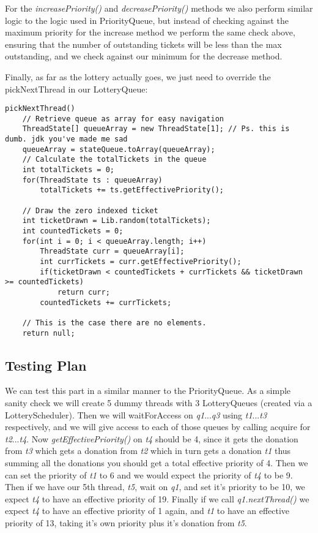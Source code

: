 \documentclass{article}
\begin{document}
For the \textit{increasePriority()} and \textit{decreasePriority()} methods we also perform similar logic to the
logic used in PriorityQueue, but instead of checking against the maximum priority for the increase method we perform
the same check above, ensuring that the number of outstanding tickets will be less than the max outstanding, and
we check against our minimum for the decrease method.

Finally, as far as the lottery actually goes, we just need to override the pickNextThread in our LotteryQueue: 
\begin{verbatim}
pickNextThread()
    // Retrieve queue as array for easy navigation
    ThreadState[] queueArray = new ThreadState[1]; // Ps. this is dumb. jdk you've made me sad
    queueArray = stateQueue.toArray(queueArray);
    // Calculate the totalTickets in the queue
    int totalTickets = 0;
    for(ThreadState ts : queueArray)
        totalTickets += ts.getEffectivePriority();
    
    // Draw the zero indexed ticket
    int ticketDrawn = Lib.random(totalTickets);
    int countedTickets = 0;
    for(int i = 0; i < queueArray.length; i++)
        ThreadState curr = queueArray[i];
        int currTickets = curr.getEffectivePriority();
        if(ticketDrawn < countedTickets + currTickets && ticketDrawn >= countedTickets)
            return curr;
        countedTickets += currTickets;
    
    // This is the case there are no elements.
    return null;
\end{verbatim}

\subsection*{Testing Plan}

We can test this part in a similar manner to the PriorityQueue. As a simple sanity check we will create 5 dummy
threads with 3 LotteryQueues (created via a LotteryScheduler). Then we will waitForAccess on \textit{q1}...\textit{q3}
using \textit{t1}...\textit{t3} respectively, and we will give access to each of those queues by calling acquire for
\textit{t2}...\textit{t4}. Now \textit{getEffectivePriority()} on \textit{t4} should be 4, since it gets the donation
from \textit{t3} which gets a donation from \textit{t2} which in turn gets a donation \textit{t1} thus summing all the
donations you should get a total effective priority of 4. Then we can set the priority of \textit{t1} to 6 and we would
expect the priority of \textit{t4} to be 9. Then if we have our 5th thread, \textit{t5}, wait on \textit{q1}, and set
it's priority to be 10, we expect \textit{t4} to have an effective priority of 19. Finally if we call
\textit{q1.nextThread()} we expect \textit{t4} to have an effective priority of 1 again, and \textit{t1} to have an
effective priority of 13, taking it's own priority plus it's donation from \textit{t5}.
\end{document}
